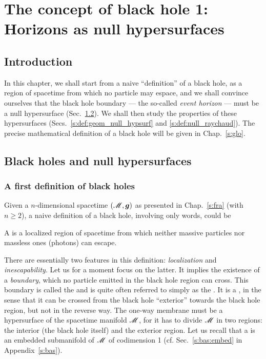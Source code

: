\chapter{The concept of black hole 1: Horizons as null hypersurfaces}
\label{s:def}

\minitoc

\section{Introduction}

In this chapter, we shall start from a naive ``definition'' of a black hole,
as a region of spacetime from which no particle may espace, and
we shall convince ourselves that the black hole boundary --- the so-called
\emph{event horizon} --- must be a null hypersurface (Sec.~\ref{s:def:BH_null_hypsurf}).
We shall then study the properties of these hypersurfaces
(Secs.~\ref{s:def:geom_null_hypsurf} and \ref{s:def:null_raychaud}).
The precise mathematical definition of a black hole will be given in Chap.~\ref{s:glo}.




\section{Black holes and null hypersurfaces} \label{s:def:BH_null_hypsurf}

\subsection{A first definition of black holes} \label{s:def:first_defin}

Given a $n$-dimensional spacetime $(\mathscr{M},\bm{g})$ as presented in Chap.~\ref{s:fra}
(with $n\geq 2$),
a naive definition of a black hole, involving only words, could be
\begin{greybox}
A  is a localized region of spacetime
from which neither massive particles nor massless ones (photons) can escape.
\end{greybox}
There are essentially two features in this definition: \emph{localization}
and \emph{inescapability}. Let us for a moment focus on the latter.
It implies the existence of a \emph{boundary}, which no
particle emitted in the black hole region can cross.
This boundary is called the
 and is
quite often referred to simply as the .
It is a ,
in the sense that it can be crossed from the black hole ``exterior'' towards
the black hole region, but not in the reverse way. The one-way membrane must be
a hypersurface of the spacetime manifold $\mathscr{M}$, for it has to divide $\mathscr{M}$ in two regions:
the interior (the black hole itself) and the exterior region.
Let us recall that a  is an
embedded submanifold of $\mathscr{M}$ of codimension 1
(cf. Sec.~\ref{s:bas:embed} in Appendix~\ref{s:bas}).

